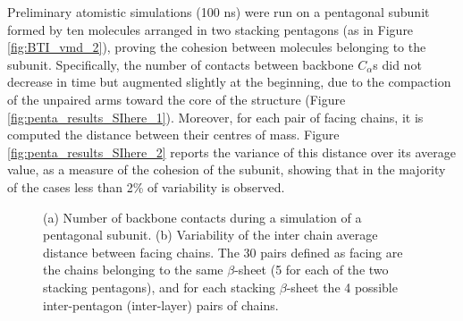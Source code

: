 Preliminary atomistic simulations (100 ns) were run on a pentagonal subunit formed by ten molecules arranged in two stacking pentagons (as in Figure \ref{fig:BTI_vmd_2}), proving the cohesion between molecules belonging to the subunit. Specifically, the number of contacts between backbone $C_\alpha$s did not decrease in time but augmented slightly at the beginning, due to the compaction of the unpaired arms toward the core of the structure (Figure \ref{fig:penta_results_SIhere_1}). Moreover, for each pair of facing chains, it is computed the distance between their centres of mass. Figure \ref{fig:penta_results_SIhere_2} reports the variance of this distance over its average value, as a measure of the cohesion of the subunit, showing that in the majority of the cases less than 2\% of variability is observed.
\begin{figure}[t]
\centering
{}
\caption[Cohesion measures on the pentagonal subunit]{(a) Number of backbone contacts during a simulation of a pentagonal subunit. (b) Variability of the inter chain average distance between facing chains. The 30 pairs defined as facing are the chains belonging to the same $\beta$-sheet (5 for each of the two stacking pentagons), and for each stacking $\beta$-sheet the 4 possible inter-pentagon (inter-layer) pairs of chains.}
\label{fig:penta_results_SIhere}
\end{figure}

